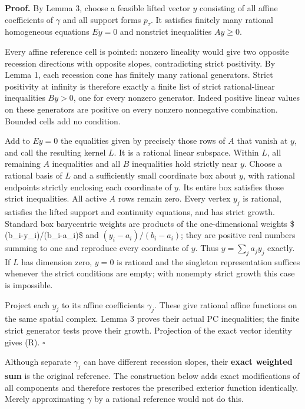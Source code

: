 \documentclass[
  11pt,
]{article}
\begin{document}
\textbf{Proof.} By Lemma 3, choose a feasible lifted vector \(y\)
consisting of all affine coefficients of \(\gamma\) and all support
forms \(p_\tau\). It satisfies finitely many rational homogeneous
equations \(Ey=0\) and nonstrict inequalities \(Ay\geq0\).

Every affine reference cell is pointed: nonzero lineality would give two
opposite recession directions with opposite slopes, contradicting strict
positivity. By Lemma 1, each recession cone has finitely many rational
generators. Strict positivity at infinity is therefore exactly a finite
list of strict rational-linear inequalities \(By>0\), one for every
nonzero generator. Indeed positive linear values on these generators are
positive on every nonzero nonnegative combination. Bounded cells add no
condition.

Add to \(Ey=0\) the equalities given by precisely those rows of \(A\)
that vanish at \(y\), and call the resulting kernel \(L\). It is a
rational linear subspace. Within \(L\), all remaining \(A\) inequalities
and all \(B\) inequalities hold strictly near \(y\). Choose a rational
basis of \(L\) and a sufficiently small coordinate box about \(y\), with
rational endpoints strictly enclosing each coordinate of \(y\). Its
entire box satisfies those strict inequalities. All active \(A\) rows
remain zero. Every vertex \(y_j\) is rational, satisfies the lifted
support and continuity equations, and has strict growth. Standard box
barycentric weights are products of the one-dimensional weights \$
(b\_i-y\_i)/(b\_i-a\_i)\$ and \((y_i-a_i)/(b_i-a_i)\); they are positive
real numbers summing to one and reproduce every coordinate of \(y\).
Thus \(y=\sum_j a_jy_j\) exactly. If \(L\) has dimension zero, \(y=0\)
is rational and the singleton representation suffices whenever the
strict conditions are empty; with nonempty strict growth this case is
impossible.

Project each \(y_j\) to its affine coefficients \(\gamma_j\). These give
rational affine functions on the same spatial complex. Lemma 3 proves
their actual PC inequalities; the finite strict generator tests prove
their growth. Projection of the exact vector identity gives (R).
\(\square\)

Although separate \(\gamma_j\) can have different recession slopes,
their \textbf{exact weighted sum} is the original reference. The
construction below adds exact modifications of all components and
therefore restores the prescribed exterior function identically. Merely
approximating \(\gamma\) by a rational reference would not do this.
\end{document}
